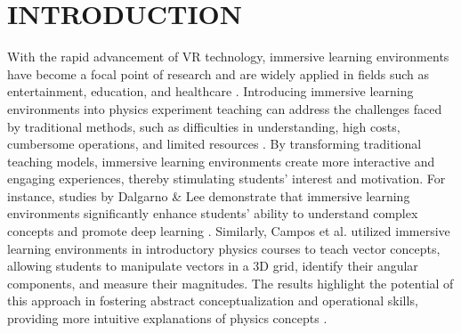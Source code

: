 \documentclass[sigconf,review,anonymous]{acmart}
\begin{document}
\section{INTRODUCTION}
With the rapid advancement of VR technology, immersive learning environments have become a focal point of research and are widely applied in fields such as entertainment, education, and healthcare \cite{luo2020dream, yeung2021virtual}. Introducing immersive learning environments into physics experiment teaching can address the challenges faced by traditional methods, such as difficulties in understanding, high costs, cumbersome operations, and limited resources \cite{yang2007impact, abu2018design}. By transforming traditional teaching models, immersive learning environments create more interactive and engaging experiences, thereby stimulating students' interest and motivation. For instance, studies by Dalgarno \& Lee demonstrate that immersive learning environments significantly enhance students' ability to understand complex concepts and promote deep learning \cite{dalgarno2010learning}. Similarly, Campos et al. utilized immersive learning environments in introductory physics courses to teach vector concepts, allowing students to manipulate vectors in a 3D grid, identify their angular components, and measure their magnitudes. The results highlight the potential of this approach in fostering abstract conceptualization and operational skills, providing more intuitive explanations of physics concepts \cite{campos2022impact}.
\end{document}
